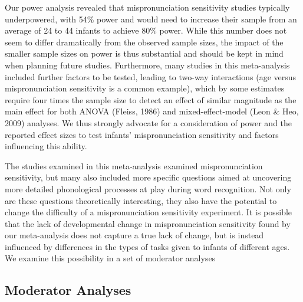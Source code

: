 \documentclass[
  english,
  man, noextraspace]{apa6}
\begin{document}
Our power analysis revealed that mispronunciation sensitivity studies typically underpowered, with 54\% power and would need to increase their sample from an average of 24 to 44 infants to achieve 80\% power. While this number does not seem to differ dramatically from the observed sample sizes, the impact of the smaller sample sizes on power is thus substantial and should be kept in mind when planning future studies. Furthermore, many studies in this meta-analysis included further factors to be tested, leading to two-way interactions (age versus mispronunciation sensitivity is a common example), which by some estimates require four times the sample size to detect an effect of similar magnitude as the main effect for both ANOVA (Fleiss, 1986) and mixed-effect-model (Leon \& Heo, 2009) analyses. We thus strongly advocate for a consideration of power and the reported effect sizes to test infants' mispronunciation sensitivity and factors influencing this ability.

The studies examined in this meta-analysis examined mispronunciation sensitivity, but many also included more specific questions aimed at uncovering more detailed phonological processes at play during word recognition. Not only are these questions theoretically interesting, they also have the potential to change the difficulty of a mispronunciation sensitivity experiment. It is possible that the lack of developmental change in mispronunciation sensitivity found by our meta-analysis does not capture a true lack of change, but is instead influenced by differences in the types of tasks given to infants of different ages. We examine this possibility in a set of moderator analyses

\hypertarget{moderator-analyses}{%
\subsection{Moderator Analyses}\label{moderator-analyses}}
\end{document}
